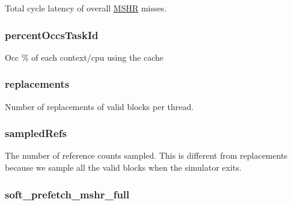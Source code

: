 \label{group__CacheStatistics_ga860805a5426cb057583a0a1eb7dd9c4c}
Total cycle latency of overall \hyperlink{classMSHR}{MSHR} misses. \hypertarget{group__CacheStatistics_ga39817ed7d6dd5fa7b0a2eb2c693b223d}{
\subsubsection[{percentOccsTaskId}]{ percentOccsTaskId}}
\label{group__CacheStatistics_ga39817ed7d6dd5fa7b0a2eb2c693b223d}
Occ \% of each context/cpu using the cache \hypertarget{group__CacheStatistics_gabe49d967160cb4f2808c2374eada5cbd}{
\subsubsection[{replacements}]{ replacements}}
\label{group__CacheStatistics_gabe49d967160cb4f2808c2374eada5cbd}
Number of replacements of valid blocks per thread. \hypertarget{group__CacheStatistics_ga0b8c102a0e9d83ec69d9ac7ee25b378b}{
\subsubsection[{sampledRefs}]{ sampledRefs}}
\label{group__CacheStatistics_ga0b8c102a0e9d83ec69d9ac7ee25b378b}
The number of reference counts sampled. This is different from replacements because we sample all the valid blocks when the simulator exits. \hypertarget{group__CacheStatistics_ga673f963f100608daf064537a4dde7ec7}{
\subsubsection[{soft\_\-prefetch\_\-mshr\_\-full}]{ soft\_\-prefetch\_\-mshr\_\-full}}
